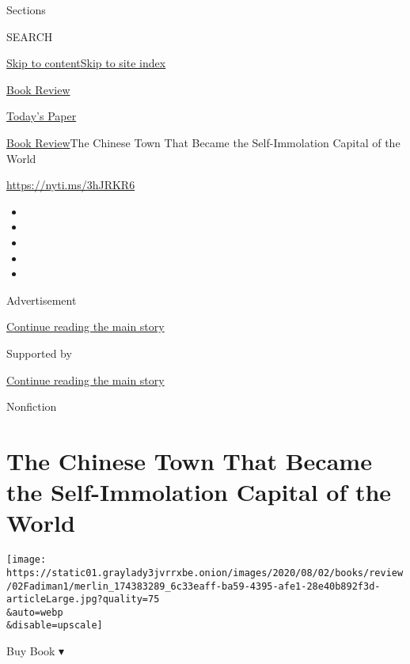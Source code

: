Sections

SEARCH

\protect\hyperlink{site-content}{Skip to
content}\protect\hyperlink{site-index}{Skip to site index}

\href{https://www.nytimes3xbfgragh.onion/section/books/review}{Book
Review}

\href{https://myaccount.nytimes3xbfgragh.onion/auth/login?response_type=cookie\&client_id=vi}{}

\href{https://www.nytimes3xbfgragh.onion/section/todayspaper}{Today's
Paper}

\href{/section/books/review}{Book Review}\textbar{}The Chinese Town That
Became the Self-Immolation Capital of the World

\url{https://nyti.ms/3hJRKR6}

\begin{itemize}
\item
\item
\item
\item
\item
\end{itemize}

Advertisement

\protect\hyperlink{after-top}{Continue reading the main story}

Supported by

\protect\hyperlink{after-sponsor}{Continue reading the main story}

Nonfiction

\hypertarget{the-chinese-town-that-became-the-self-immolation-capital-of-the-world}{%
\section{The Chinese Town That Became the Self-Immolation Capital of the
World}\label{the-chinese-town-that-became-the-self-immolation-capital-of-the-world}}

\texttt{[image: https://static01.graylady3jvrrxbe.onion/images/2020/08/02/books/review/02Fadiman1/merlin\_174383289\_6c33eaff-ba59-4395-afe1-28e40b892f3d-articleLarge.jpg?quality=75\\\&auto=webp\\\&disable=upscale]}

Buy Book ▾

